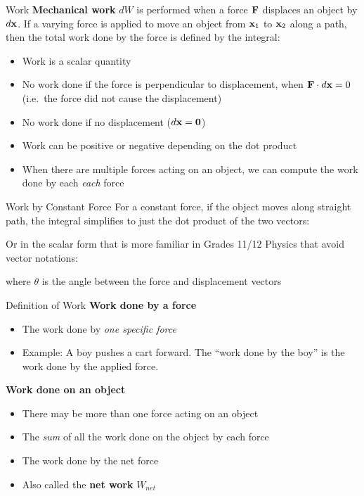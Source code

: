 \documentclass[12pt,compress,aspectratio=169]{beamer}
\newcommand{\mb}[1]{\ensuremath\mathbf{#1}}
\newcommand{\eq}[2]{\vspace{#1}{\Large\begin{displaymath}#2\end{displaymath}}}
\begin{document}
\begin{frame}{Work}
  \textbf{Mechanical work} $dW$ is performed when a force $\mb{F}$ displaces an
  object by $d\mb{x}$. If a varying force
  is applied to move an object from $\mb{x}_1$ to $\mb{x}_2$ along a path, then
  the total work done by the force is defined by the integral:

  \eq{-.2in}{
    W=\int\mb{F}(\mb{x})\cdot d\mb{x}
  }

  \begin{itemize}
  \item Work is a scalar quantity
  \item No work done if the force is perpendicular to displacement, when
    $\mb{F}\cdot d\mb{x}=0$ (i.e.\ the force did not cause the displacement)
  \item No work done if no displacement ($d\mb{x}=\mb{0}$)
  \item Work can be positive or negative depending on the dot product
  \item When there are multiple forces acting on an object, we can compute the
    work done by each \emph{each} force
  \end{itemize}
\end{frame}



\begin{frame}{Work by Constant Force}
  For a constant force, if the object moves along straight path, the integral
  simplifies to just the dot product of the two vectors:

  \eq{-.2in}{
    \boxed{
      W=\mb{F}\cdot\Delta\mb{r}
    }
  }

  Or in the scalar form that is more familiar in Grades 11/12 Physics that
  avoid vector notations:

  \eq{-.2in}{
    \boxed{W=F\Delta x\cos\theta}
  }

  \vspace{-.1in}where $\theta$ is the angle between the force and displacement
  vectors
\end{frame}



\begin{frame}{Definition of Work}
  \textbf{Work done by a force}
  \begin{itemize}
  \item The work done by \emph{one specific force}
  \item Example: A boy pushes a cart forward. The ``work done by the boy'' is
    the work done by the applied force.
  \end{itemize}

  \vspace{.15in}\textbf{Work done on an object}
  \begin{itemize}
  \item There may be more than one force acting on an object
  \item The \emph{sum} of all the work done on the object by each force
  \item The work done by the net force
  \item Also called the \textbf{net work} $W_{net}$
  \end{itemize}
\end{frame}
\end{document}
